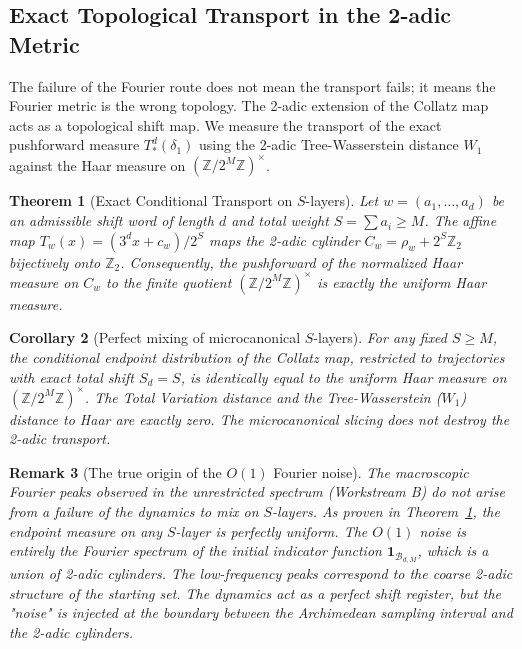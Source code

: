\documentclass[12pt,a4paper]{article}
\newtheorem{theorem}{Theorem}[section]
\newtheorem{corollary}[theorem]{Corollary}
\newtheorem{remark}[theorem]{Remark}
\begin{document}
\subsection{Exact Topological Transport in the 2-adic Metric}

The failure of the Fourier route does not mean the transport fails; it means the Fourier metric is the wrong topology. The 2-adic extension of the Collatz map acts as a topological shift map. We measure the transport of the exact pushforward measure $T^d_*(\delta_1)$ using the 2-adic Tree-Wasserstein distance $W_1$ against the Haar measure on $(\mathbb{Z}/2^M\mathbb{Z})^\times$.

\begin{theorem}[Exact Conditional Transport on $S$-layers]
\label{thm:exact_conditional_transport}
Let $w = (a_1, \ldots, a_d)$ be an admissible shift word of length $d$ and total weight $S = \sum a_i \ge M$. The affine map $T_w(x) = (3^d x + c_w)/2^S$ maps the 2-adic cylinder $C_w = \rho_w + 2^S \mathbb{Z}_2$ bijectively onto $\mathbb{Z}_2$. Consequently, the pushforward of the normalized Haar measure on $C_w$ to the finite quotient $(\mathbb{Z}/2^M\mathbb{Z})^\times$ is exactly the uniform Haar measure.
\end{theorem}

\begin{corollary}[Perfect mixing of microcanonical $S$-layers]
For any fixed $S \ge M$, the conditional endpoint distribution of the Collatz map, restricted to trajectories with exact total shift $S_d = S$, is identically equal to the uniform Haar measure on $(\mathbb{Z}/2^M\mathbb{Z})^\times$. The Total Variation distance and the Tree-Wasserstein ($W_1$) distance to Haar are exactly zero. The microcanonical slicing does not destroy the 2-adic transport.
\end{corollary}

\begin{remark}[The true origin of the $O(1)$ Fourier noise]
The macroscopic Fourier peaks observed in the unrestricted spectrum (Workstream B) do not arise from a failure of the dynamics to mix on $S$-layers. As proven in Theorem~\ref{thm:exact_conditional_transport}, the endpoint measure on any $S$-layer is perfectly uniform. The $O(1)$ noise is entirely the Fourier spectrum of the \emph{initial} indicator function $\mathbf{1}_{\mathcal{B}_{d,M}}$, which is a union of 2-adic cylinders. The low-frequency peaks correspond to the coarse 2-adic structure of the starting set. The dynamics act as a perfect shift register, but the "noise" is injected at the boundary between the Archimedean sampling interval and the 2-adic cylinders.
\end{remark}
\end{document}
